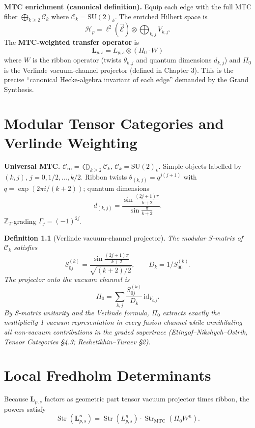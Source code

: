 \documentclass[11pt, oneside]{book}
\newtheorem{definition}[theorem]{Definition}
\begin{document}
\textbf{MTC enrichment (canonical definition).} Equip each edge with the full MTC fiber \(\bigoplus_{k\ge2}\mathcal{C}_k\) where \(\mathcal{C}_k=\mathrm{SU}(2)_k\). The enriched Hilbert space is
\[
\mathcal{H}_p=\ell^2(\vec{\mathcal{E}})\otimes\bigoplus_{k,j}V_{k,j}.
\]
The \textbf{MTC-weighted transfer operator} is
\[
\mathbf{L}_{p,s}=L_{p,s}\otimes(\Pi_0\cdot W)
\]
where \(W\) is the ribbon operator (twists \(\theta_{k,j}\) and quantum dimensions \(d_{k,j}\)) and \(\Pi_0\) is the Verlinde vacuum-channel projector (defined in Chapter 3). This is the precise ``canonical Hecke-algebra invariant of each edge'' demanded by the Grand Synthesis.

\chapter{Modular Tensor Categories and Verlinde Weighting}
\label{ch:mtc}

\textbf{Universal MTC.} \(\mathcal{C}_\infty=\bigoplus_{k\ge2}\mathcal{C}_k\), \(\mathcal{C}_k=\mathrm{SU}(2)_k\). Simple objects labelled by \((k,j)\), \(j=0,1/2,\dots,k/2\). Ribbon twists \(\theta_{(k,j)}=q^{j(j+1)}\) with \(q=\exp(2\pi i/(k+2))\); quantum dimensions
\[
d_{(k,j)}=\frac{\sin\frac{(2j+1)\pi}{k+2}}{\sin\frac{\pi}{k+2}}.
\]
\(\mathbb{Z}_2\)-grading \(\Gamma_j=(-1)^{2j}\).

\begin{definition}[Verlinde vacuum-channel projector]
The modular \(S\)-matrix of \(\mathcal{C}_k\) satisfies
\[
S_{0j}^{(k)}=\frac{\sin\frac{(2j+1)\pi}{k+2}}{\sqrt{(k+2)/2}},\qquad D_k=1/S_{00}^{(k)}.
\]
The projector onto the vacuum channel is
\[
\Pi_0=\sum_{k,j}\frac{S_{0j}^{(k)}}{D_k}\,\mathrm{id}_{V_{k,j}}.
\]
By S-matrix unitarity and the Verlinde formula, \(\Pi_0\) extracts exactly the multiplicity-1 vacuum representation in every fusion channel while annihilating all non-vacuum contributions in the graded supertrace (Etingof--Nikshych--Ostrik, \emph{Tensor Categories} \S4.3; Reshetikhin--Turaev \S2).
\end{definition}

\chapter{Local Fredholm Determinants}
\label{ch:fredholm}

Because \(\mathbf{L}_{p,s}\) factors as geometric part tensor vacuum projector times ribbon, the powers satisfy
\[
\operatorname{Str}(\mathbf{L}_{p,s}^n)=\operatorname{Str}(L_{p,s}^n)\cdot\operatorname{Str}_{\mathrm{MTC}}(\Pi_0 W^n).
\]
\end{document}
